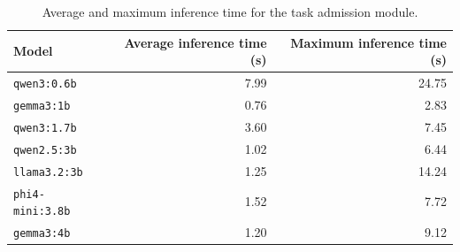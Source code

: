 \begin{table}[htbp]
\centering
\caption{Average and maximum inference time for the task admission module.}
\label{tab:task_admission_inference_time}
\begin{tabular}{lrr}
\toprule
Model & Average inference time (s) & Maximum inference time (s) \\
\midrule
\texttt{qwen3:0.6b} & 7.99 & 24.75 \\
\texttt{gemma3:1b} & 0.76 & 2.83 \\
\texttt{qwen3:1.7b} & 3.60 & 7.45 \\
\texttt{qwen2.5:3b} & 1.02 & 6.44 \\
\texttt{llama3.2:3b} & 1.25 & 14.24 \\
\texttt{phi4-mini:3.8b} & 1.52 & 7.72 \\
\texttt{gemma3:4b} & 1.20 & 9.12 \\
\bottomrule
\end{tabular}

\end{table}
